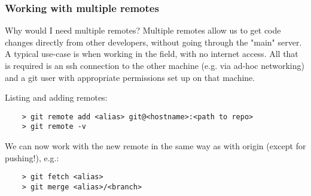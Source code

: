 
\begin{frame}[fragile]
	\frametitle{Working with multiple remotes}
	
	\begin{block}{Why would I need multiple remotes?}
	Multiple remotes allow us to get code changes directly from other developers, without going through the "main" server. A typical use-case is when working in the field, with no internet access. All that is required is an ssh connection to the other machine (e.g. via ad-hoc networking) and a git user with appropriate permissions set up on that machine. 
	\end{block}	

	Listing and adding remotes:
	\begin{verbatim}
	> git remote add <alias> git@<hostname>:<path to repo>	
	> git remote -v	
	\end{verbatim}
	
	We can now work with the new remote in the same way as with origin (except for pushing!), e.g.:
	\begin{verbatim}
	> git fetch <alias>
	> git merge <alias>/<branch>
	\end{verbatim}
	
\end{frame}

